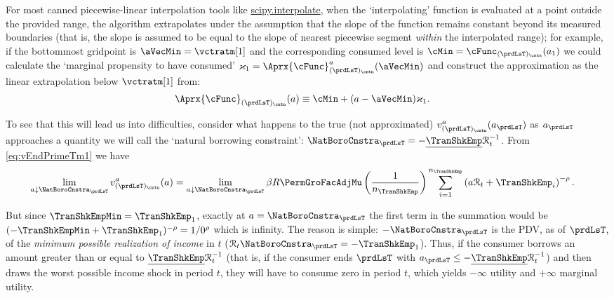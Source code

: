 \documentclass[titlepage, headings=optiontotocandhead]{Resources/texmf-local/tex/latex/econtex}
\begin{document}
For most canned piecewise-linear interpolation tools like \href{https://docs.scipy.org/doc/scipy/tutorial/interpolate.html}{scipy.interpolate}, when the `interpolating' function is evaluated at a point outside the provided range, the algorithm extrapolates under the assumption that the slope of the function remains constant beyond its measured boundaries (that is, the slope is assumed to be equal to the slope of nearest piecewise segment \emph{within} the interpolated range); for example, if the bottommost gridpoint is $\aVecMin = \vctratm[1]$ and the corresponding consumed level is $\cMin = \cFunc_{(\prdLsT)_\cntn}(a_1)$ we could calculate the `marginal propensity to have consumed' $\varkappa_{1}=
\Aprx{\cFunc}_{(\prdLsT)_\cntn}^{a}(\aVecMin)$ and construct the approximation as the linear extrapolation below $\vctratm[1]$ from:
\begin{equation}\begin{gathered}\begin{aligned}
      \Aprx{\cFunc}_{(\prdLsT)_\cntn}(a)  &  \equiv \cMin + (a-\aVecMin)\varkappa_{1}  \label{eq:ExtrapLin}.
    \end{aligned}\end{gathered}\end{equation}

To see that this will lead us into difficulties, consider what happens to the true (not approximated) $v^{a}_{(\prdLsT)_\cntn}(a_{\prdLsT})$ as $a_{\prdLsT}$ approaches a quantity we will call the `natural borrowing constraint': $\NatBoroCnstra_{\prdLsT}=-\underline{\TranShkEmp}\mathcal{R}_{t}^{-1}$.  From
\eqref{eq:vEndPrimeTm1} we have
\begin{equation}\begin{gathered}\begin{aligned}
      \lim_{a \downarrow \NatBoroCnstra_{\prdLsT}} v^{a}_{(\prdLsT)_\cntn}(a)
      & =                                                                                         \lim_{a \downarrow \NatBoroCnstra_{\prdLsT}} \beta R \PermGroFacAdjMu \left(\frac{1}{n_{\TranShkEmp}}\right) \sum_{i=1}^{n_{\TranShkEmp}} \left( a \mathcal{R}_{t}+ \TranShkEmp_{i}\right)^{-\rho}.
    \end{aligned}\end{gathered}\end{equation}

But since $\TranShkEmpMin=\TranShkEmp_{1}$, exactly at $a=\NatBoroCnstra_{\prdLsT}$ the first term in the summation would be $(-\TranShkEmpMin+\TranShkEmp_{1})^{-\rho}=1/0^{\rho}$ which is infinity.  The reason is simple: $-\NatBoroCnstra_{\prdLsT}$ is the PDV, as of $\prdLsT$, of the \emph{minimum possible realization of income} in $t$ ($\mathcal{R}_{t}\NatBoroCnstra_{\prdLsT} = -\TranShkEmp_{1}$).  Thus, if the consumer borrows an amount greater than or equal to $\underline{\TranShkEmp}\mathcal{R}_{t}^{-1}$ (that is, if the consumer ends $\prdLsT$ with $a_{\prdLsT} \leq -\underline{\TranShkEmp}\mathcal{R}_{t}^{-1}$) and then draws the worst possible income shock in period $t$, they will have to consume zero in period $t$, which yields $-\infty$ utility and $+\infty$ marginal utility.
\end{document}
